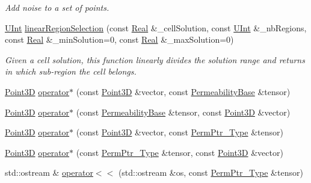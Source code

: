 \begin{DoxyCompactItemize}
\begin{DoxyCompactList}\small\item\em Add noise to a set of points. \end{DoxyCompactList}\item 
\hyperlink{namespaceFVCode3D_a4bf7e328c75d0fd504050d040ebe9eda}{U\+Int} \hyperlink{namespaceFVCode3D_ae0b3b38fc8dff58445ba3d625deae285}{linear\+Region\+Selection} (const \hyperlink{namespaceFVCode3D_a40c1f5588a248569d80aa5f867080e83}{Real} \&\+\_\+cell\+Solution, const \hyperlink{namespaceFVCode3D_a4bf7e328c75d0fd504050d040ebe9eda}{U\+Int} \&\+\_\+nb\+Regions, const \hyperlink{namespaceFVCode3D_a40c1f5588a248569d80aa5f867080e83}{Real} \&\+\_\+min\+Solution=0, const \hyperlink{namespaceFVCode3D_a40c1f5588a248569d80aa5f867080e83}{Real} \&\+\_\+max\+Solution=0)
\begin{DoxyCompactList}\small\item\em Given a cell solution, this function linearly divides the solution range and returns in which sub-\/region the cell belongs. \end{DoxyCompactList}\item 
\hyperlink{classFVCode3D_1_1Point3D}{Point3D} \hyperlink{namespaceFVCode3D_af2319dd0d3c654e7509d9b94d14a12ca}{operator$\ast$} (const \hyperlink{classFVCode3D_1_1Point3D}{Point3D} \&vector, const \hyperlink{classFVCode3D_1_1PermeabilityBase}{Permeability\+Base} \&tensor)
\item 
\hyperlink{classFVCode3D_1_1Point3D}{Point3D} \hyperlink{namespaceFVCode3D_a3ec4a02287df57f0a18c692eb037438a}{operator$\ast$} (const \hyperlink{classFVCode3D_1_1PermeabilityBase}{Permeability\+Base} \&tensor, const \hyperlink{classFVCode3D_1_1Point3D}{Point3D} \&vector)
\item 
\hyperlink{classFVCode3D_1_1Point3D}{Point3D} \hyperlink{namespaceFVCode3D_affee75e028879b6669f318166c054d71}{operator$\ast$} (const \hyperlink{classFVCode3D_1_1Point3D}{Point3D} \&vector, const \hyperlink{namespaceFVCode3D_aee5ae48a57366603109f90f526a645b1}{Perm\+Ptr\+\_\+\+Type} \&tensor)
\item 
\hyperlink{classFVCode3D_1_1Point3D}{Point3D} \hyperlink{namespaceFVCode3D_a1c83364114566de0a24e730333cf4ba6}{operator$\ast$} (const \hyperlink{namespaceFVCode3D_aee5ae48a57366603109f90f526a645b1}{Perm\+Ptr\+\_\+\+Type} \&tensor, const \hyperlink{classFVCode3D_1_1Point3D}{Point3D} \&vector)
\item 
std\+::ostream \& \hyperlink{namespaceFVCode3D_a2350a6eec9008d3b691e5ee6e4290914}{operator$<$$<$} (std\+::ostream \&os, const \hyperlink{namespaceFVCode3D_aee5ae48a57366603109f90f526a645b1}{Perm\+Ptr\+\_\+\+Type} \&tensor)

\end{DoxyCompactItemize}
